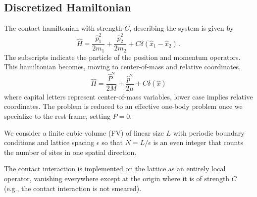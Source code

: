 \subsection{Discretized Hamiltonian}\label{sec:hamiltonian}

The contact hamiltonian with strength $C$, describing the system is given by
\begin{equation}
    \label{eq:particle hamiltonian}
    \hat H = \frac{\hat p_1^2}{2 m_1} + \frac{\hat p_2^2}{2 m_2} + C \delta(\hat x_1 - \hat x_2)
    \, .
\end{equation}
The subscripts indicate the particle of the position and momentum operators.
This hamiltonian becomes, moving to center-of-mass and relative coordinates,
\begin{equation}
    \label{eq:hamiltonian}
    \hat H = \frac{\hat P^2}{2 M} + \frac{\hat p^2}{2 \mu} + C \delta(\hat x)
\end{equation}
where capital letters represent center-of-mass variables, lower case implies relative coordinates.
The problem is reduced to an effective one-body problem once we specialize to the rest frame, setting $P=0$.

We consider a finite cubic volume (FV) of linear size $L$ with periodic boundary conditions and lattice spacing $\epsilon$ so that $N=L/\epsilon$ is an even integer that counts the number of sites in one spatial direction.

The contact interaction is implemented on the lattice as an entirely local operator, vanishing everywhere except at the origin where it is of strength $C$ (e.g., the contact interaction is not smeared).

